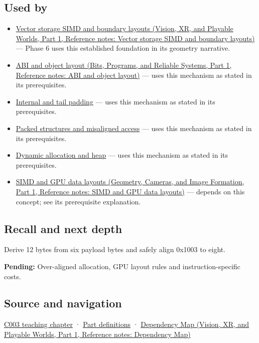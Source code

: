 \subsection{Used by}\label{appendix-a1f7c53b4742-used-by}

\hypertarget{appendix-a1f7c53b4742-used-by}{}

\begin{itemize}
\item
  \href{../07-Vision-XR-and-Playable-Worlds-P01/main.pdf\#appendix-26bf6bf2fb8b}{Vector storage SIMD and boundary layouts (Vision, XR, and Playable Worlds, Part 1, Reference notes: Vector storage SIMD and boundary layouts)} --- Phase 6 uses this established foundation in its geometry narrative.
\item
  \href{../01-Bits-Programs-and-Reliable-Systems-P01/main.pdf\#appendix-c4ac6bb0fff8}{ABI and object layout (Bits, Programs, and Reliable Systems, Part 1, Reference notes: ABI and object layout)} --- uses this mechanism as stated in its prerequisites.
\item
  \hyperref[appendix-f52f8c5a3afd]{Internal and tail padding} --- uses this mechanism as stated in its prerequisites.
\item
  \hyperref[appendix-0682dbfc5f0e]{Packed structures and misaligned access} --- uses this mechanism as stated in its prerequisites.
\item
  \hyperref[appendix-c3480f7d9ff3]{Dynamic allocation and heap} --- uses this mechanism as stated in its prerequisites.
\item
  \href{../03-Geometry-Cameras-and-Image-Formation-P01/main.pdf\#appendix-3c7b1a56de01}{SIMD and GPU data layouts (Geometry, Cameras, and Image Formation, Part 1, Reference notes: SIMD and GPU data layouts)} --- depends on this concept; see its prerequisite explanation.
\end{itemize}

\subsection{Recall and next depth}\label{appendix-a1f7c53b4742-recall-and-next-depth}

\hypertarget{appendix-a1f7c53b4742-recall-and-next-depth}{}

Derive 12 bytes from six payload bytes and safely align 0x1003 to eight.

\textbf{Pending:} Over-aligned allocation, GPU layout rules and instruction-specific costs.

\subsection{Source and navigation}\label{appendix-a1f7c53b4742-source-and-navigation}

\hypertarget{appendix-a1f7c53b4742-source-and-navigation}{}

\hyperref[01-foundations-i-ch002-where-the-bytes-live]{C003 teaching chapter} · \hyperref[appendix-fd090d982a15-m003---parts-41-60]{Part definitions} · \href{../07-Vision-XR-and-Playable-Worlds-P01/main.pdf\#appendix-4ad47bdd269a}{Dependency Map (Vision, XR, and Playable Worlds, Part 1, Reference notes: Dependency Map)}
